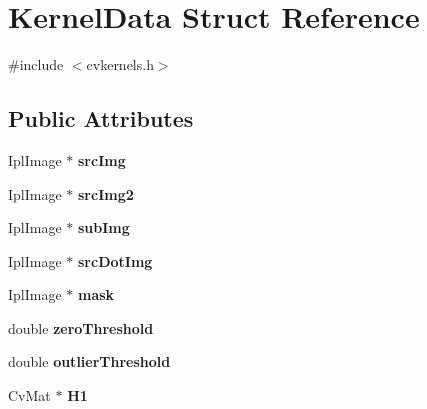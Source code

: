 \hypertarget{struct_kernel_data}{}\section{Kernel\+Data Struct Reference}
\label{struct_kernel_data}


{\ttfamily \#include $<$cvkernels.\+h$>$}

\subsection*{Public Attributes}
\begin{DoxyCompactItemize}
\item 
\mbox{\label{struct_kernel_data_ac7901528c5bc892c574140033dfe28e4}} 
Ipl\+Image $\ast$ {\bfseries src\+Img}
\item 
\mbox{\label{struct_kernel_data_a2f20eb790d20c9a9e8039143b7ba7d79}} 
Ipl\+Image $\ast$ {\bfseries src\+Img2}
\item 
\mbox{\label{struct_kernel_data_afc587cdb94748fa99fefa0ebac5e0205}} 
Ipl\+Image $\ast$ {\bfseries sub\+Img}
\item 
\mbox{\label{struct_kernel_data_a8c522692e2e135efc341b8b613d99d86}} 
Ipl\+Image $\ast$ {\bfseries src\+Dot\+Img}
\item 
\mbox{\label{struct_kernel_data_ad50538378b59ab674616568d4cbb0e82}} 
Ipl\+Image $\ast$ {\bfseries mask}
\item 
\mbox{\label{struct_kernel_data_a53b07d59e2f9756858744cd090d3edb9}} 
double {\bfseries zero\+Threshold}
\item 
\mbox{\label{struct_kernel_data_a2022d9c5733f14bc3b4d39b40b1c9e57}} 
double {\bfseries outlier\+Threshold}
\item 
\mbox{\label{struct_kernel_data_a8b2d4e546cefe1500fa49d14ef898923}} 
Cv\+Mat $\ast$ {\bfseries H1}
\item 
\mbox{\label{struct_kernel_data_ad84c0cf145b6e750531bc8fde3da97a9}} 

\end{DoxyCompactItemize}
